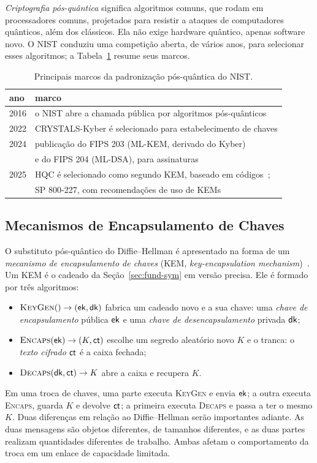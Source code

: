\emph{Criptografia pós-quântica} significa algoritmos comuns, que rodam em
processadores comuns, projetados para resistir a ataques de computadores
quânticos, além dos clássicos. Ela não exige hardware quântico, apenas software
novo. O NIST conduziu uma competição aberta, de vários anos, para selecionar
esses algoritmos; a Tabela~\ref{tab:nist} resume seus marcos.

\begin{table}[!htb]
\caption{Principais marcos da padronização pós-quântica do NIST.}
\label{tab:nist}
\centering
\small
\begin{tabular}{ll}
\toprule
ano & marco\\
\midrule
2016 & o NIST abre a chamada pública por algoritmos pós-quânticos\\
2022 & CRYSTALS-Kyber é selecionado para estabelecimento de chaves\\
2024 & publicação do FIPS 203 (ML-KEM, derivado do Kyber)~\cite{fips203}\\
     & e do FIPS 204 (ML-DSA), para assinaturas~\cite{fips204}\\
2025 & HQC é selecionado como segundo KEM, baseado em códigos~\cite{nisthqc2025};\\
     & SP 800-227, com recomendações de uso de KEMs~\cite{sp800227}\\
\bottomrule
\end{tabular}
\end{table}

\subsection{Mecanismos de Encapsulamento de Chaves}\label{sec:fund-kem}
O substituto pós-quântico do Diffie--Hellman é apresentado na forma de um
\emph{mecanismo de encapsulamento de chaves} (KEM, \emph{key-encapsulation
mechanism})~\cite{cramer2003kem,sp800227}. Um KEM é o cadeado da
Seção~\ref{sec:fund-sym} em versão precisa. Ele é formado por três algoritmos:
\begin{itemize}
\item $\textsc{KeyGen}() \to (\mathsf{ek}, \mathsf{dk})$ fabrica um cadeado novo e a sua chave:
      uma \emph{chave de encapsulamento} pública $\mathsf{ek}$ e uma \emph{chave de
      desencapsulamento} privada $\mathsf{dk}$;
\item $\textsc{Encaps}(\mathsf{ek}) \to (K, \mathsf{ct})$ escolhe um segredo aleatório novo $K$
      e o tranca: o \emph{texto cifrado} $\mathsf{ct}$ é a caixa fechada;
\item $\textsc{Decaps}(\mathsf{dk}, \mathsf{ct}) \to K$ abre a caixa e recupera $K$.
\end{itemize}
Em uma troca de chaves, uma parte executa \textsc{KeyGen} e envia $\mathsf{ek}$; a
outra executa \textsc{Encaps}, guarda $K$ e devolve $\mathsf{ct}$; a primeira executa
\textsc{Decaps} e passa a ter o mesmo $K$. Duas diferenças em relação ao
Diffie--Hellman serão importantes adiante. As duas mensagens são objetos
diferentes, de tamanhos diferentes, e as duas partes realizam quantidades
diferentes de trabalho. Ambas afetam o comportamento da troca em um enlace de
capacidade limitada.

